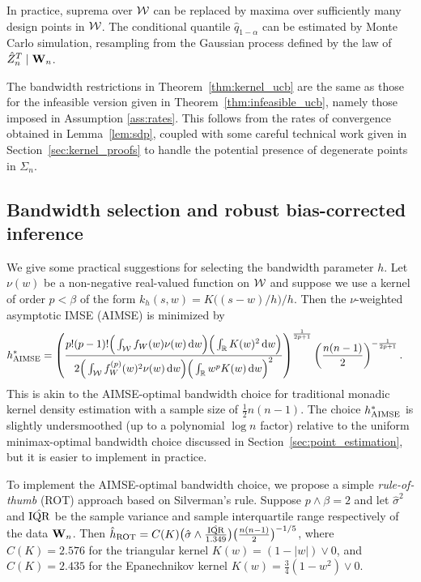 In practice, suprema over $\mathcal{W}$ can be replaced by maxima over sufficiently
many design points in $\mathcal{W}$. The conditional quantile $\hat q_{1-\alpha}$ can
be estimated by Monte Carlo simulation, resampling from the Gaussian process
defined by the law of $\hat Z_n^T \mid \mathbf{W}_n$.

The bandwidth restrictions in Theorem~\ref{thm:kernel_ucb} are the same as
those for the infeasible version given in Theorem~\ref{thm:infeasible_ucb},
namely those imposed in Assumption \ref{ass:rates}. This follows from the rates
of convergence obtained in Lemma~\ref{lem:sdp}, coupled with some careful
technical work given in Section~\ref{sec:kernel_proofs} to handle the potential
presence of degenerate points in $\Sigma_n$.

\subsection{Bandwidth selection and robust bias-corrected inference}
\label{sec:bandwidth_selection}

We give some practical suggestions for selecting the bandwidth parameter $h$.
Let $\nu(w)$ be a non-negative real-valued function on $\mathcal{W}$ and suppose we use
a kernel of order $p < \beta$ of the form $k_h(s,w) = K\big((s-w) / h\big)/h$.
Then the $\nu$-weighted asymptotic IMSE (AIMSE) is minimized by
%
\begin{align*}
  h^*_{\operatorname{AIMSE}}
  &=
  \left(
    \frac{p!(p-1)!
      \Big(\int_{\mathcal{W}} f_W(w) \nu(w) \,\mathrm{d}w\Big)
    \Big(\int_{\mathbb{R}} K(w)^2 \,\mathrm{d}w\Big)}
    {2 \Big(
        \int_{\mathcal{W}}
        f_W^{(p)}(w)^2
        \nu(w)
        \,\mathrm{d}w
      \Big)
      \Big(
        \int_{\mathbb{R}}
        w^p K(w)
        \,\mathrm{d}w
      \Big)^2
    }
  \right)^{\frac{1}{2p+1}}
  \left( \frac{n(n-1)}{2} \right)^{-\frac{1}{2p+1}}.
\end{align*}
%
This is akin to the AIMSE-optimal bandwidth choice for traditional monadic
kernel density estimation with a sample size of $\frac{1}{2}n(n-1)$. The choice
$h^*_{\operatorname{AIMSE}}$ is slightly undersmoothed (up to a polynomial $\log n$ factor)
relative to the uniform minimax-optimal bandwidth choice discussed in
Section~\ref{sec:point_estimation}, but it is easier to implement in practice.

To implement the AIMSE-optimal bandwidth choice, we propose a simple
\emph{rule-of-thumb} (ROT) approach based on Silverman's rule.
Suppose $p\wedge\beta=2$ and let $\hat\sigma^2$ and $\hat{\operatorname{IQR}}$
be the sample variance and sample interquartile range respectively
of the data $\mathbf{W}_n$. Then
$\hat{h}_{\operatorname{ROT}} = C(K) \big( \hat\sigma \wedge
\frac{\hat{\operatorname{IQR}}}{1.349} \big) \big(\frac{n(n-1)}{2} \big)^{-1/5}$,
where $C(K)=2.576$ for the triangular kernel $K(w) = (1 - |w|) \vee 0$,
and $C(K)=2.435$ for the Epanechnikov kernel
$K(w) = \frac{3}{4}(1 - w^2) \vee 0$.

